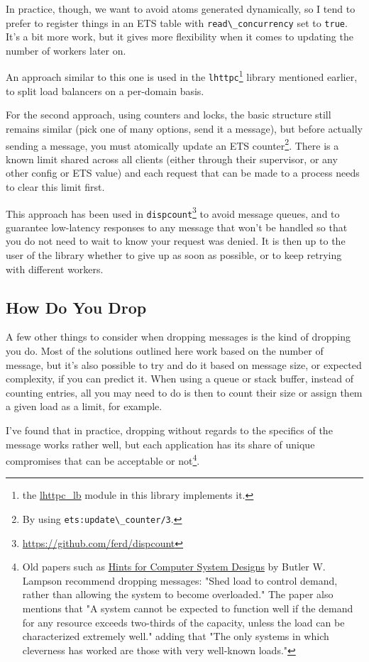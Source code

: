\documentclass[11pt, oneside]{book}   	%
\newcommand{\module}[1]{\Verb`#1`}
\newcommand{\function}[1]{\Verb`#1`}
\newcommand{\expression}[1]{\Verb`#1`}
\begin{document}
In practice, though, we want to avoid atoms generated dynamically, so I tend to prefer to register things in an ETS table with \expression{read\_concurrency} set to \expression{true}. It's a bit more work, but it gives more flexibility when it comes to updating the number of workers later on.

An approach similar to this one is used in the \module{lhttpc}\footnote{the \href{https://github.com/ferd/lhttpc/blob/master/src/lhttpc\_lb.erl}{lhttpc\_lb} module in this library implements it.} library mentioned earlier, to split load balancers on a per-domain basis.

For the second approach, using counters and locks, the basic structure still remains similar (pick one of many options, send it a message), but before actually sending a message, you must atomically update an ETS counter\footnote{By using \function{ets:update\_counter/3}.}. There is a known limit shared across all clients (either through their supervisor, or any other config or ETS value) and each request that can be made to a process needs to clear this limit first.

This approach has been used in \module{dispcount}\footnote{\href{https://github.com/ferd/dispcount}{https://github.com/ferd/dispcount}} to avoid message queues, and to guarantee low-latency responses to any message that won't be handled so that you do not need to wait to know your request was denied. It is then up to the user of the library whether to give up as soon as possible, or to keep retrying with different workers.

\subsection{How Do You Drop}

A few other things to consider when dropping messages is the kind of dropping you do. Most of the solutions outlined here work based on the number of message, but it's also possible to try and do it based on message size, or expected complexity, if you can predict it. When using a queue or stack buffer, instead of counting entries, all you may need to do is then to count their size or assign them a given load as a limit, for example.

I've found that in practice, dropping without regards to the specifics of the message works rather well, but each application has its share of unique compromises that can be acceptable or not\footnote{Old papers such as \href{http://research.microsoft.com/en-us/um/people/blampson/33-hints/webpage.html}{Hints for Computer System Designs} by Butler W. Lampson recommend dropping messages: "Shed load to control demand, rather than allowing the system to become overloaded." The paper also mentions that  "A system cannot be expected to function well if the demand for any resource exceeds two-thirds of the capacity, unless the load can be characterized extremely well." adding that "The only systems in which cleverness has worked are those with very well-known loads."}.
\end{document}
